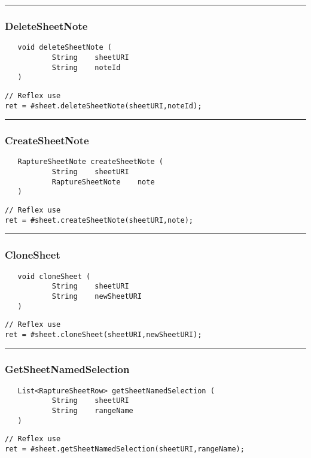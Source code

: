 \rule{15cm}{2pt}
\subsubsection{DeleteSheetNote}
\label{Api:DeleteSheetNote}
\begin{verbatim}
   void deleteSheetNote (
           String    sheetURI
           String    noteId
   )
\end{verbatim}
\begin{lstlisting}[language=reflex]
// Reflex use
ret = #sheet.deleteSheetNote(sheetURI,noteId);
\end{lstlisting}



\rule{15cm}{2pt}
\subsubsection{CreateSheetNote}
\label{Api:CreateSheetNote}
\begin{verbatim}
   RaptureSheetNote createSheetNote (
           String    sheetURI
           RaptureSheetNote    note
   )
\end{verbatim}
\begin{lstlisting}[language=reflex]
// Reflex use
ret = #sheet.createSheetNote(sheetURI,note);
\end{lstlisting}



\rule{15cm}{2pt}
\subsubsection{CloneSheet}
\label{Api:CloneSheet}
\begin{verbatim}
   void cloneSheet (
           String    sheetURI
           String    newSheetURI
   )
\end{verbatim}
\begin{lstlisting}[language=reflex]
// Reflex use
ret = #sheet.cloneSheet(sheetURI,newSheetURI);
\end{lstlisting}



\rule{15cm}{2pt}
\subsubsection{GetSheetNamedSelection}
\label{Api:GetSheetNamedSelection}
\begin{verbatim}
   List<RaptureSheetRow> getSheetNamedSelection (
           String    sheetURI
           String    rangeName
   )
\end{verbatim}
\begin{lstlisting}[language=reflex]
// Reflex use
ret = #sheet.getSheetNamedSelection(sheetURI,rangeName);
\end{lstlisting}



